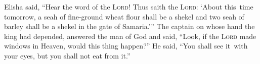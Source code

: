 
\begin{inparaenum}
   Elisha said, ``Hear the word of the \textsc{Lord}! Thus saith the \textsc{Lord}: `About this\understood\ time tomorrow, a seah of fine-ground wheat flour shall be a shekel and two seah of barley shall be a shekel in the gate of Samaria.'\thinspace''%
   The captain on whose hand the king had depended, answered the man of God and said, ``Look, if the \textsc{Lord} made windows in Heaven, would this thing happen?'' He said, ``You shall see it\understood\ with your eyes, but you shall not eat from it.''%
  

\end{inparaenum}
